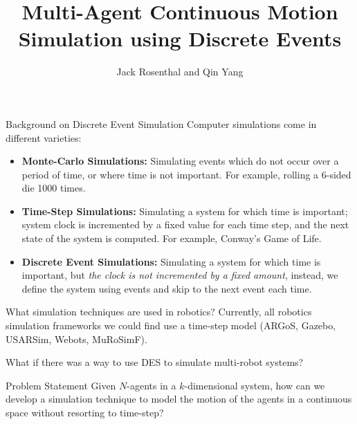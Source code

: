 \documentclass[aspectratio=1610,mathserif]{beamer}
\title{Multi-Agent Continuous Motion Simulation using Discrete Events}
\author{Jack Rosenthal and Qin Yang}
\institute{Robot Planning \& Manipulation}
\begin{document}
\maketitle

\begin{frame}{Background on Discrete Event Simulation}
    Computer simulations come in different varieties:
    \begin{itemize}
        \item \textbf{Monte-Carlo Simulations:} Simulating events which do not
            occur over a period of time, or where time is not important. For
            example, rolling a 6-sided die 1000 times.
        \item \textbf{Time-Step Simulations:} Simulating a system for which
            time is important; system clock is incremented by a fixed value for
            each time step, and the next state of the system is computed. For
            example, Conway's Game of Life.
        \item \textbf{Discrete Event Simulations:} Simulating a system for
            which time is important, but \emph{the clock is not incremented by
            a fixed amount}, instead, we define the system using events and
            skip to the next event each time.
    \end{itemize}
\end{frame}

\begin{frame}{What simulation techniques are used in robotics?}
    Currently, all robotics simulation frameworks we could find use a time-step
    model (ARGoS, Gazebo, USARSim, Webots, MuRoSimF).

    What if there was a way to use DES to simulate multi-robot systems?
\end{frame}

\begin{frame}{Problem Statement}
    Given $N$-agents in a $k$-dimensional system, how can we develop a
    simulation technique to model the motion of the agents in a continuous
    space without resorting to time-step?
\end{frame}
\end{document}
